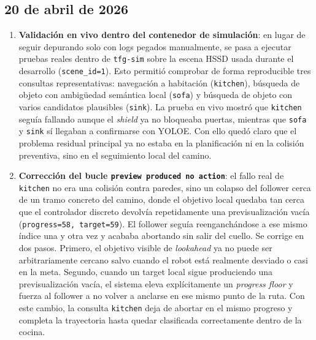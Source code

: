 \subsection*{20 de abril de 2026}

\begin{enumerate}

  \item \textbf{Validación en vivo dentro del contenedor de simulación}: en
        lugar de seguir depurando solo con logs pegados manualmente, se pasa a
        ejecutar pruebas reales dentro de \texttt{tfg-sim} sobre la escena
        HSSD usada durante el desarrollo (\texttt{scene\_id=1}). Esto permitió
        comprobar de forma reproducible tres consultas representativas:
        navegación a habitación (\texttt{kitchen}), búsqueda de objeto con
        ambigüedad semántica local (\texttt{sofa}) y búsqueda de objeto con
        varios candidatos plausibles (\texttt{sink}). La prueba en vivo mostró
        que \texttt{kitchen} seguía fallando aunque el \textit{shield} ya no
        bloqueaba puertas, mientras que \texttt{sofa} y \texttt{sink} sí
        llegaban a confirmarse con YOLOE. Con ello quedó claro que el problema
        residual principal ya no estaba en la planificación ni en la
        colisión preventiva, sino en el seguimiento local del camino.

  \item \textbf{Corrección del bucle \texttt{preview produced no action}}:
        el fallo real de \texttt{kitchen} no era una colisión contra paredes,
        sino un colapso del follower cerca de un tramo concreto del camino,
        donde el objetivo local quedaba tan cerca que el controlador discreto
        devolvía repetidamente una previsualización vacía
        (\texttt{progress=58, target=59}). El follower seguía reenganchándose a
        ese mismo índice una y otra vez y acababa abortando sin salir del
        cuello. Se corrige en dos pasos. Primero, el objetivo visible de
        \textit{lookahead} ya no puede ser arbitrariamente cercano salvo cuando
        el robot está realmente desviado o casi en la meta. Segundo, cuando un
        target local sigue produciendo una previsualización vacía, el sistema
        eleva explícitamente un \textit{progress floor} y fuerza al follower a
        no volver a anclarse en ese mismo punto de la ruta. Con este cambio, la
        consulta \texttt{kitchen} deja de abortar en el mismo progreso y
        completa la trayectoria hasta quedar clasificada correctamente dentro de
        la cocina.


\end{enumerate}
